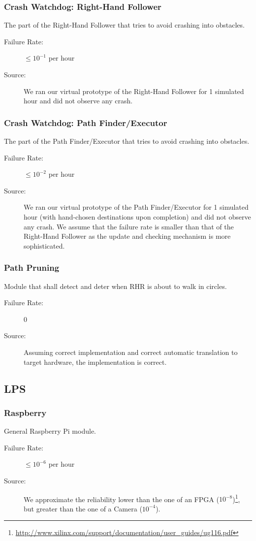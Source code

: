 \documentclass[a4paper,parskip,headheight=38pt]{scrartcl} %
\begin{document}
\subsubsection{Crash Watchdog: Right-Hand Follower}
The part of the Right-Hand Follower that tries to avoid crashing into obstacles.
\begin{description}
\item[Failure Rate:] $\leq 10^{-1}$ per hour
\item[Source:] We ran our virtual prototype of the Right-Hand Follower
for 1 simulated hour and did not observe any crash.
\end{description}

\subsubsection{Crash Watchdog: Path Finder/Executor}
The part of the Path Finder/Executor that tries to avoid crashing into obstacles.
\begin{description}
\item[Failure Rate:] $\leq 10^{-2}$ per hour
\item[Source:] We ran our virtual prototype of the Path Finder/Executor
for 1 simulated hour (with hand-chosen destinations upon completion) and
did not observe any crash.  We assume that the failure rate is smaller
than that of the Right-Hand Follower as the update and checking
mechanism is more sophisticated.
\end{description}

\subsubsection{Path Pruning}
Module that shall detect and deter when RHR is about to walk in circles.
\begin{description}
\item[Failure Rate:] 0
\item[Source:] Assuming correct implementation and correct automatic translation
to target hardware, the implementation is correct.
\end{description}

\subsection{LPS} %

\subsubsection{Raspberry}
General Raspberry Pi module.
\begin{description}
\item[Failure Rate:] $\leq 10^{-6}$ per hour
\item[Source:] We approximate the reliability lower than the one of an FPGA ($10^{-8}$)\footnote{\url{http://www.xilinx.com/support/documentation/user_guides/ug116.pdf}}, but greater than the one of a Camera ($10^{-4}$).
\end{description}
\end{document}
